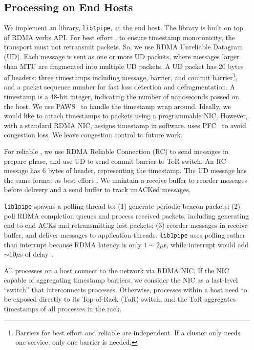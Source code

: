 \subsection{Processing on End Hosts}

We implement an \sys{} library, \texttt{lib1pipe}, at the end host. The library is built on top of RDMA verbs API.
For best effort \sys{}, to ensure timestamp monotonicity, the transport must not retransmit packets.
So, we use RDMA Unreliable Datagram (UD).
Each \sys{} message is sent as one or more UD packets, where \sys{} messages larger than MTU are fragmented into multiple UD packets.
A UD packet has 20 bytes of headers: three timestamps including message, barrier, and commit barrier\footnote{Barriers for best effort and reliable \sys{} are independent. If a cluster only needs one service, only one barrier is needed.}, and a packet sequence number for fast loss detection and defragmentation.
A timestamp is a 48-bit integer, indicating the number of nanoseconds passed on the host. %
We use PAWS~\cite{jacobson1992tcp} to handle the timestamp wrap around.
Ideally, we would like to attach timestamps to packets using a programmable NIC.
However, with a standard RDMA NIC, \sys{} assigns timestamp in software.
\sys{} uses PFC~\cite{pfc} to avoid congestion loss. We leave congestion control to future work.

For reliable \sys{}, we use RDMA Reliable Connection (RC) to send messages in prepare phase, and use UD to send commit barrier to ToR switch.
An RC message has 6 bytes of header, representing the timestamp.
The UD message has the same format as best effort \sys{}.
We maintain a receive buffer to reorder messages before delivery and a send buffer to track unACKed messages.

\texttt{lib1pipe} spawns a polling thread to: (1) generate periodic beacon packets; (2) poll RDMA completion queues and process received packets, including generating end-to-end ACKs and retransmitting lost packets; (3) reorder messages in receive buffer, and deliver messages to application threads.
\texttt{lib1pipe} uses polling rather than interrupt because RDMA latency is only $1\sim2 \mu$s, while interrupt would add $\sim10 \mu$s of delay~\cite{yang2012poll}.

All processes on a host connect to the network via RDMA NIC. If the NIC capable of aggregating timestamp barriers, we consider the NIC as a last-level ``switch'' that interconnects processes. Otherwise, processes within a host need to be exposed directly to its Top-of-Rack (ToR) switch, and the ToR aggregates timestamps of all processes in the rack.

